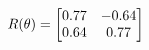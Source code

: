 \documentclass[preview]{standalone}
\begin{document}
\begin{align*}
\special{dvisvgm:raw <g id='unique000'>}R(\theta) = \begin{bmatrix}0.77 & -0.64\\0.64 & 0.77\end{bmatrix}\special{dvisvgm:raw </g>}
\end{align*}
\end{document}
